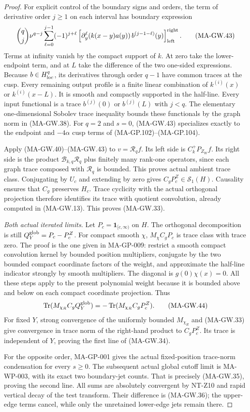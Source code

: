 \begin{proof}
For explicit control of the boundary signs and orders,
the term of derivative order $j\ge1$ on each interval
has boundary expression
\[
 \binom qj\nu^{q-j}
       \sum_{\ell=0}^{j-1}(-1)^{j+\ell}
        \left[\partial_y^\ell(k(x-y)a(y))\,
                    b^{(j-1-\ell)}(y)\right]_{\rm left}^{\rm right}.
 \tag{MA-GW.43}
\]
Terms at infinity vanish by the compact support of $k$.
At zero take the lower-endpoint term, and at $L$ take
the difference of the two one-sided expressions.
Because $b\in H^q_{\rm loc}$, its derivatives through
order $q-1$ have common traces at the cusp.
Every remaining output profile is a finite linear
combination of $k^{(i)}(x)$ or $k^{(i)}(x-L)$.
It is smooth and compactly supported in the half-line.
Every input functional is a trace $b^{(j)}(0)$ or
$b^{(j)}(L)$ with $j<q$.
The elementary one-dimensional Sobolev trace inequality
bounds these functionals by the graph norm in (MA-GW.38).
For $q=2$ and $s=0$, (MA-GW.43) specializes exactly
to the endpoint and $-4\alpha$ cusp terms of
(MA-GP.102)--(MA-GP.104).

Apply (MA-GW.40)--(MA-GW.43) to $v=\mathcal R_q f$.
Its left side is $C_k^+P_{Z_W}f$.
Its right side is the product
$\mathcal B_{k,q}\mathcal R_q$ plus finitely many
rank-one operators, since each graph trace composed
with $\mathcal R_q$ is bounded.
This proves actual ambient trace class.
Conjugating by $U_c$ and extending by zero gives
$C_gP_c^Z\in\mathcal S_1(H)$.
Causality ensures that $C_g$ preserves $H_c$.
Trace cyclicity with the actual orthogonal projection
therefore identifies its trace with quotient convolution,
already computed in (MA-GW.13).
This proves (MA-GW.33).

\emph{Both actual iterated limits.}
Let $P_c=\mathbf1_{[c,\infty)}$ on $H$.
The orthogonal decomposition is still
$Q_Y^{\rm glob}=P_c-P_c^Z$.
For compact smooth $\chi$, $M_\chi C_gP_c$ is trace
class with trace zero.
The proof is the one given in MA-GP-009: restrict a
smooth compact convolution kernel by bounded position
multipliers, conjugate by the two bounded compact
coordinate factors of the weight, and approximate
the half-line indicator strongly by smooth multipliers.
The diagonal is $g(0)\chi(x)=0$.
All these steps apply to the present polynomial weight
because it is bounded above and below on each compact
coordinate projection.
Thus
\[
 \operatorname{Tr}(M_{\chi_R}C_gQ_Y^{\rm glob})
                    =-\operatorname{Tr}(M_{\chi_R}C_gP_c^Z).
 \tag{MA-GW.44}
\]
For fixed $Y$, strong convergence of the uniformly
bounded $M_{\chi_R}$ and (MA-GW.33) give convergence
in trace norm of the right-hand product to $C_gP_c^Z$.
Its trace is independent of $Y$, proving the first
line of (MA-GW.34).

For the opposite order, MA-GP-001 gives the actual
fixed-position trace-norm condensation for every
$s\ge0$.  The subsequent actual global cutoff limit
is MA-WP-003, with its exact two boundary-jet counts.
That is precisely (MA-GW.35), proving the second line.
All sums are absolutely convergent by NT-Z10 and
rapid vertical decay of the test transform.
Their difference is (MA-GW.36); the upper-edge terms
cancel, while only the unretained lower-edge jets
remain there.
\end{proof}


